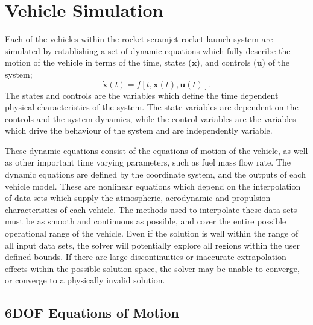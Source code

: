 \section{Vehicle Simulation}


Each of the vehicles within the rocket-scramjet-rocket launch system are simulated by establishing a set of dynamic equations which fully describe the motion of the vehicle in terms of the time, states ($\mathbf{x}$), and controls ($\mathbf{u}$) of the system;
\begin{equation}
\dot{\textbf{x}}(t) = f[t,\textbf{x}(t),\textbf{u}(t)].
\end{equation}
 The states and controls are the variables which define the time dependent physical characteristics of the system. The state variables are dependent on the controls and the system dynamics, while the control variables are the variables which drive the behaviour of the system and are independently variable.  
 
These dynamic equations consist of the equations of motion of the vehicle, as well as other important time varying parameters, such as fuel mass flow rate. 
The dynamic equations are defined by the coordinate system, and the outputs of each vehicle model. These are nonlinear equations which depend on the interpolation of data sets which supply the atmospheric, aerodynamic and propulsion characteristics of each vehicle. 
The methods used to interpolate these data sets must be as smooth and continuous as possible, and cover the entire possible operational range of the vehicle. 
Even if the solution is well within the range of all input data sets, the solver will potentially explore all regions within the user defined bounds. 
If there are large discontinuities or inaccurate extrapolation effects within the possible solution space, the solver may be unable to converge, or converge to a physically invalid solution. 


\subsection{6DOF Equations of Motion}


